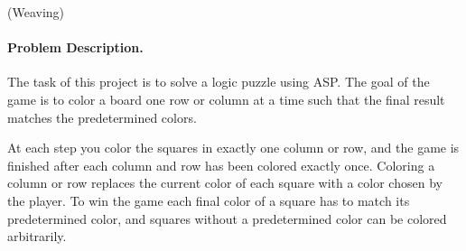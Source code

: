 \documentclass[a4paper,12pt]{article}
\begin{document}
\begin{PraktikumsAufgabe}{1}{(Weaving)}
\vspace*{-4mm}
\paragraph{Problem Description.}
%
%
The task of this project is to solve a logic puzzle using ASP.
The goal of the game is to color a board one row or column at a time such that the final
result matches the predetermined colors.

At each step you color the squares in exactly one column or row, 
and the game is finished after each column and row has been colored exactly once.
Coloring a column or row replaces the current color of each square with a color chosen by the player.
To win the game each final color of a square has to match its predetermined color,
and squares without a predetermined color can be colored arbitrarily.


\end{PraktikumsAufgabe}
\end{document}

